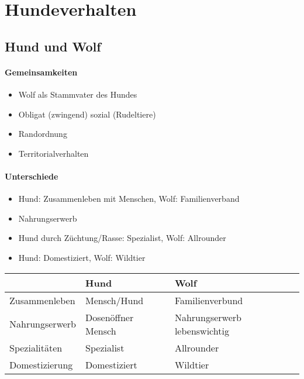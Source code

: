 \chapter{Hundeverhalten}
\label{ch:Hundeverhalten}

\section{Hund und Wolf}
\label{ch:Hundeverhalten1:sec:Hund_und_Wolf}

\subsubsection{Gemeinsamkeiten}
\begin{itemize}
    \item Wolf als Stammvater des Hundes
    \item Obligat (zwingend) sozial (Rudeltiere)
    \item Randordnung
    \item Territorialverhalten
\end{itemize}

\subsubsection{Unterschiede}
\begin{itemize}
    \item Hund: Zusammenleben mit Menschen, Wolf: Familienverband
    \item Nahrungserwerb
    \item Hund durch Züchtung/Rasse: Spezialist, Wolf: Allrounder
    \item Hund: Domestiziert, Wolf: Wildtier
\end{itemize}

\begin{center}
    \begin{tabular}{l|l|l}
        & Hund & Wolf \\
        \hline
        Zusammenleben & Mensch/Hund & Familienverbund \\
        Nahrungserwerb & Dosenöffner Mensch & Nahrungserwerb lebenswichtig \\
        Spezialitäten & Spezialist & Allrounder \\
        Domestizierung & Domestiziert & Wildtier
    \end{tabular}
\end{center}